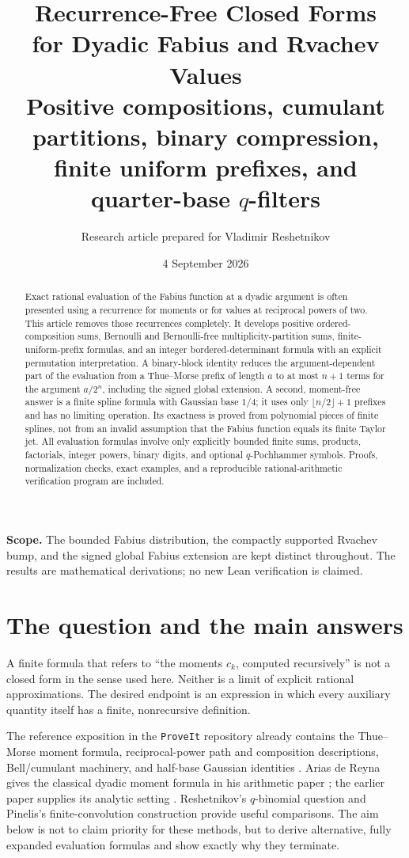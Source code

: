 \documentclass[11pt,a4paper]{article}
\title{\color{inkblue}\bfseries Recurrence-Free Closed Forms\\[0.2em]
 for Dyadic Fabius and Rvachev Values\\[0.7em]
 \large Positive compositions, cumulant partitions, binary compression,\\
 finite uniform prefixes, and quarter-base \(q\)-filters}
\author{Research article prepared for Vladimir Reshetnikov}
\date{4 September 2026}
\theoremstyle{definition}
\theoremstyle{remark}
\begin{document}
\maketitle
\begin{abstract}
Exact rational evaluation of the Fabius function at a dyadic argument is often
presented using a recurrence for moments or for values at reciprocal powers of two.
This article removes those recurrences completely.  It develops positive
ordered-composition sums, Bernoulli and Bernoulli-free multiplicity-partition sums,
finite-uniform-prefix formulas, and an integer bordered-determinant formula with an
explicit permutation interpretation.  A binary-block identity reduces the
argument-dependent part of the evaluation from a Thue--Morse prefix of length
\(a\) to at most \(n+1\) terms for the argument \(a/2^n\), including the signed
global extension.  A second, moment-free answer is a finite spline formula with
Gaussian base \(1/4\); it uses only \(\lfloor n/2\rfloor+1\) prefixes and has no
limiting operation.  Its exactness is proved from polynomial pieces of finite
splines, not from an invalid assumption that the Fabius function equals its finite
Taylor jet.  All evaluation formulas involve only explicitly bounded finite sums,
products, factorials, integer powers, binary digits, and optional \(q\)-Pochhammer
symbols.  Proofs, normalization checks, exact examples, and a reproducible
rational-arithmetic verification program are included.
\end{abstract}
\vfill
\noindent\textbf{Scope.} The bounded Fabius distribution, the compactly supported
Rvachev bump, and the signed global Fabius extension are kept distinct throughout.
The results are mathematical derivations; no new Lean verification is claimed.
\newpage
\begingroup
\small
\setlength{\parskip}{0pt}
\tableofcontents
\endgroup
\newpage

\section{The question and the main answers}
\label{sec:introduction}
A finite formula that refers to ``the moments \(c_k\), computed recursively'' is
not a closed form in the sense used here.  Neither is a limit of explicit rational
approximations.  The desired endpoint is an expression in which every auxiliary
quantity itself has a finite, nonrecursive definition.

The reference exposition in the \texttt{ProveIt} repository already contains the
Thue--Morse moment formula, reciprocal-power path and composition descriptions,
Bell/cumulant machinery, and half-base Gaussian identities \cite{repo}.
Arias de Reyna gives the classical dyadic moment formula in his arithmetic paper
\cite{arias2018}; the earlier paper supplies its analytic setting \cite{arias1982}.
Reshetnikov's \(q\)-binomial question \cite{reshetnikov2019} and Pinelis's
finite-convolution construction \cite{pinelis2020} provide useful comparisons.
The aim below is not to claim priority for these methods, but to derive alternative,
fully expanded evaluation formulas and show exactly why they terminate.
\end{document}

